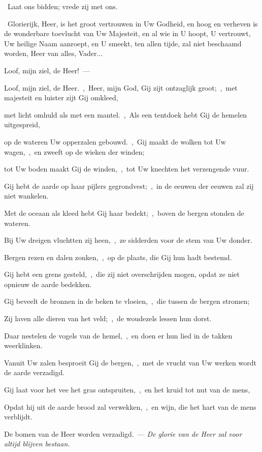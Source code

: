 \documentclass[12pt,twoside,a5paper]{article}
\begin{document}
\begin{halfparskip}
  \dd~Laat ons bidden; vrede zij met ons.

  \cc~Glorierijk, Heer, is het groot vertrouwen in Uw Godheid, en hoog en verheven is de wonderbare toevlucht van Uw Majesteit, en al wie in U hoopt, U vertrouwt, Uw heilige Naam aanroept, en U smeekt, ten allen tijde, zal niet beschaamd worden, Heer van alles, Vader...
\end{halfparskip}

\begin{halfparskip}
   Loof, mijn ziel, de Heer!~--- 

  Loof, mijn ziel, de Heer.~\sep\ Heer, mijn God, Gij zijt ontzaglijk groot;~\sep\ met majesteit en luister zijt Gij omkleed,

  met licht omhuld als met een mantel.~\sep\ Als een tentdoek hebt Gij de hemelen uitgespreid,

  op de wateren Uw opperzalen gebouwd.~\sep\ Gij maakt de wolken tot Uw wagen,~\sep\ en zweeft op de wieken der winden;

  tot Uw boden maakt Gij de winden,~\sep\ tot Uw knechten het verzengende vuur.

  Gij hebt de aarde op haar pijlers gegrondvest;~\sep\ in de eeuwen der eeuwen zal zij niet wankelen.

  Met de oceaan als kleed hebt Gij haar bedekt;~\sep\ boven de bergen stonden de wateren.

  Bij Uw dreigen vluchtten zij heen,~\sep\ ze sidderden voor de stem van Uw donder.

  Bergen rezen en dalen zonken,~\sep\ op de plaats, die Gij hun hadt bestemd.

  Gij hebt een grens gesteld,~\sep\ die zij niet overschrijden mogen, opdat ze niet opnieuw de aarde bedekken.

  Gij beveelt de bronnen in de beken te vloeien,~\sep\ die tussen de bergen stromen;

  Zij laven alle dieren van het veld;~\sep\ de woudezels lessen hun dorst.

  Daar nestelen de vogels van de hemel,~\sep\ en doen er hun lied in de takken weerklinken.

  Vanuit Uw zalen besproeit Gij de bergen,~\sep\ met de vrucht van Uw werken wordt de aarde verzadigd.

  Gij laat voor het vee het gras ontspruiten,~\sep\ en het kruid tot nut van de mens,

  Opdat hij uit de aarde brood zal verwekken,~\sep\ en wijn, die het hart van de mens verblijdt.

  De bomen van de Heer worden verzadigd.~---  \emph{De glorie van de Heer zal voor altijd blijven bestaan.}
\end{halfparskip}
\end{document}
